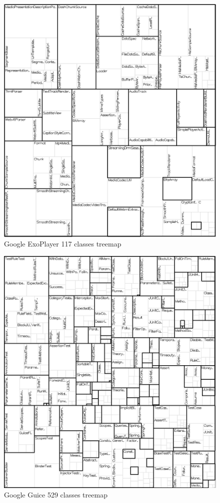 \begin{figure}[H]
  \centering
  \includegraphics[width=1\textwidth]{figures/exo_tree.png}
  \caption{Google ExoPlayer 117 classes treemap}
  \label{fig:exo_tree}
\end{figure}

\begin{figure}[H]
  \centering
  \includegraphics[width=1\textwidth]{figures/guice_tree.png}
  \caption{Google Guice 529 classes treemap}
  \label{fig:guice_tree}
\end{figure}

